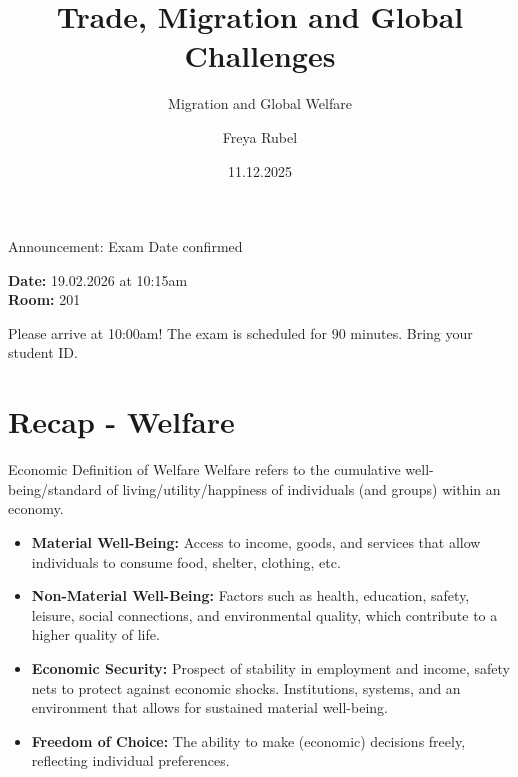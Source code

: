\documentclass{beamer}
\author{Freya Rubel}
\title{Trade, Migration and Global Challenges}
\subtitle{Migration and Global Welfare}
\institute{}
\date{11.12.2025}
\begin{document}
\begin{frame}
    \titlepage
\end{frame}

\begin{frame}{Announcement: Exam Date confirmed}
\centering
\vspace{0.5cm}

\begin{tcolorbox}[colback=red!5!white,colframe=red!75!black,title=Final Exam]
\centering
\Large
\textbf{Date:} 19.02.2026 at 10:15am \\
\textbf{Room:} 201 \\
\end{tcolorbox}

\vspace{0.5cm}
\begin{normalsize}
Please arrive at 10:00am! The exam is scheduled for 90 minutes. Bring your student ID.
\end{normalsize}

\end{frame}

\begin{frame}
    \tableofcontents[sectionstyle=show, subsectionstyle=show/shaded/hide, subsubsectionstyle=show/shaded/hide]
\end{frame}

\section{Recap - Welfare}
\begin{frame}{Economic Definition of Welfare}
    Welfare refers to the cumulative well-being/standard of living/utility/happiness of individuals (and groups) within an economy. 
    \begin{itemize} \small
        \item \textbf{Material Well-Being:} Access to income, goods, and services that allow individuals to consume food, shelter, clothing, etc. 
        \item \textbf{Non-Material Well-Being:} Factors such as health, education, safety, leisure, social connections, and environmental quality, which contribute to a higher quality of life.
        \item \textbf{Economic Security:} Prospect of stability in employment and income, safety nets to protect against economic shocks. Institutions, systems, and an environment that allows for sustained material well-being.
        \item \textbf{Freedom of Choice:} The ability to make (economic) decisions freely, reflecting individual preferences.
    \end{itemize}
\end{frame}
\end{document}

